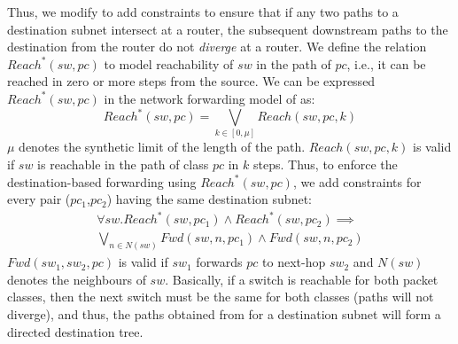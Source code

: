 Thus, we modify \genesis to add constraints to ensure that
if any two paths to a destination subnet intersect at a router,
the subsequent downstream paths to the destination from the
router do not \emph{diverge} at a router.  
We define the relation $Reach^*(sw,pc)$ to model reachability 
of $sw$ in the path of $pc$, i.e., it can be reached in zero or more
steps from the source. We can be expressed $Reach^*(sw,pc)$ 
in the network forwarding model of \genesis as:
\begin{equation}
	Reach^*(sw,pc) = \bigvee_{k \in [0, \mu]} Reach(sw, pc, k)
\end{equation}
$\mu$ denotes the synthetic limit of the length of the path. 
$Reach(sw, pc, k)$ is valid if $sw$ is reachable in the path of
class $pc$ in $k$ steps. Thus, to enforce the destination-based
forwarding using $Reach^*(sw,pc)$, we add
constraints for every pair ($pc_1$,$pc_2$) having the same 
 destination subnet:
 \begin{multline}
 \forall sw. Reach^*(sw, pc_1) \wedge Reach^*(sw, pc_2) \implies \\ \bigvee_{n \in N(sw)} Fwd(sw, n, pc_1) \wedge Fwd(sw, n, pc_2)
 \end{multline}
 $Fwd(sw_1, sw_2,pc)$ is valid if $sw_1$ forwards $pc$ to next-hop $sw_2$ and
 $N(sw)$ denotes the neighbours of $sw$. Basically, 
 if a switch is reachable for both packet classes, 
 then the next switch must be the same for both classes
 (paths will not diverge), and thus, the paths obtained
 from \genesis for a destination subnet will form a 
 directed destination tree. 

